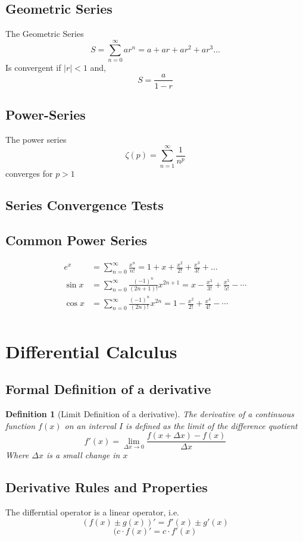 \documentclass[12pt]{article}
\newtheorem{defn}{Definition}
\begin{document}
\subsection{Geometric Series}
The Geometric Series
$$S = \sum_{n=0}^{\infty}{ar^{n}} = a + ar + ar^2 + ar^3\dots 
$$
Is convergent if $|r|< 1$ and,
$$S = \frac{a}{1-r}$$
\subsection{Power-Series}
The power series
$$\zeta(p) = \sum_{n = 1}^{\infty} \frac{1}{n^p}$$
converges for $p>1$
\subsection{Series Convergence Tests}
\subsection{Common Power Series}
\begin{align*}
e^x &= \sum_{n=0}^{\infty}{\frac{x^n}{n!}} = 1 + x + \frac{x^2}{2!} + \frac{x^3}{3!}+\dots \\
\sin x &= \sum^{\infty}_{n=0} \frac{(-1)^n}{(2n+1)!} x^{2n+1} =  x - \frac{x^3}{3!} + \frac{x^5}{5!} - \cdots\\
\cos x &= \sum^{\infty}_{n=0} \frac{(-1)^n}{(2n)!} x^{2n} =  1 - \frac{x^2}{2!} + \frac{x^4}{4!} - \cdots \\
\end{align*}



\section{Differential Calculus}
\subsection{Formal Definition of a derivative}
\begin{defn}[Limit Definition of a derivative]
	The derivative of a continuous function $f(x)$ on an interval $I$ is defined as the limit of the difference quotient
	$$f'(x) = \lim_{\Delta x \to 0}{\frac{f(x + \Delta x) - f(x)}{\Delta x}}$$
	Where $\Delta x$ is a small change in $x$
\end{defn}
\subsection{Derivative Rules and Properties}
The differntial operator is a linear operator, i.e.\,
$${(f(x) \pm g(x))}' = f'(x) \pm g'(x)$$ 
$${(c\cdot f(x)}' = c\cdot f'(x)$$
\end{document}
